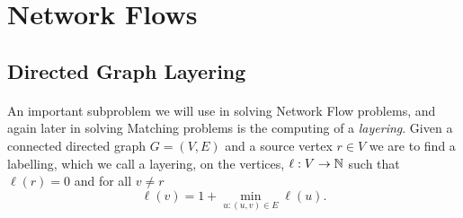 \section{Network Flows}\label{sec:nf}

\subsection{Directed Graph Layering}
\paragraph{}
An important subproblem we will use in solving Network Flow problems, and again later in solving Matching problems is the computing of a {\it layering}. Given a connected directed graph $G = (V,E)$ and a source vertex $r \in V$ we are to find a labelling, which we call a layering, on the vertices, $\ell : V \rightarrow \mathbb{N}$ such that $\ell(r) = 0$ and for all $v\neq r$
$$ \ell(v) = 1+ \min_{u:(u,v) \in E} \ell(u).$$
